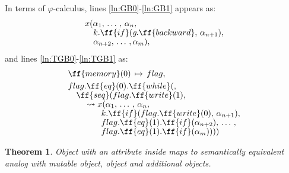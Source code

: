 \documentclass[sigplan,review,11pt,nonacm,natbib=false]{acmart}
\theoremstyle{theorems}
\newtheorem{eotheorem}{Theorem}
\newcommand\br{\\[-4pt]}
\begin{document}
    In terms of $\varphi$-calculus, lines \ref{ln:GB0}-\ref{ln:GB1} appears as:
    \begin{equation}
        \begin{split}
            & x (\alpha_1,\,\ldots\,,\,\alpha_n, \br
            & \quad k.\ff{if}(\emph{g}.\ff{backward},\,\alpha_{n+1}),\br
            & \quad \alpha_{n+2},\,\ldots\,, \alpha_m), \\
        \end{split}
    \end{equation}
    and lines \ref{ln:TGB0}-\ref{ln:TGB1} as:
    \begin{equation}
        \begin{split}
            & \ff{memory}(0)\,\mapsto\,flag, \\
            & flag.\ff{eq}(0).\ff{while}(, \br
            & \quad \ff{seq}(flag.\ff{write}(1), \br
            & \quad \quad \leadsto x (\alpha_1,\,\ldots\,,\,\alpha_n, \br
            & \quad \quad \quad \quad k.\ff{if}(flag.\ff{write}(0),\,\alpha_{n+1}), \br
            & \quad \quad \quad \quad flag.\ff{eq}(1).\ff{if}(\alpha_{n+2}),\,\ldots\,, \br
            & \quad \quad \quad \quad flag.\ff{eq}(1).\ff{if}(\alpha_{m})))) \\
        \end{split}
    \end{equation}


    \begin{eotheorem}
        Object  with an attribute  inside maps to semantically equivalent analog with mutable object, object  and additional  objects.
    \end{eotheorem}
\end{document}
